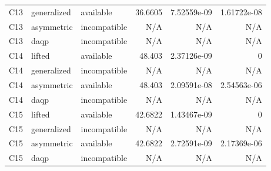 \begin{table}[htbp]
\begin{tabularx}{\textwidth}{@{}ll>{\raggedright\arraybackslash}Xrrr@{}}
C13 & generalized & available & 36.\allowbreak{}6605 & 7.\allowbreak{}52559e-09 & 1.\allowbreak{}61722e-08\\
C13 & asymmetric & incompatible & N/\allowbreak{}A & N/\allowbreak{}A & N/\allowbreak{}A\\
C13 & daqp & incompatible & N/\allowbreak{}A & N/\allowbreak{}A & N/\allowbreak{}A\\
C14 & lifted & available & 48.\allowbreak{}403 & 2.\allowbreak{}37126e-09 & 0\\
C14 & generalized & incompatible & N/\allowbreak{}A & N/\allowbreak{}A & N/\allowbreak{}A\\
C14 & asymmetric & available & 48.\allowbreak{}403 & 2.\allowbreak{}09591e-08 & 2.\allowbreak{}54563e-06\\
C14 & daqp & incompatible & N/\allowbreak{}A & N/\allowbreak{}A & N/\allowbreak{}A\\
C15 & lifted & available & 42.\allowbreak{}6822 & 1.\allowbreak{}43467e-09 & 0\\
C15 & generalized & incompatible & N/\allowbreak{}A & N/\allowbreak{}A & N/\allowbreak{}A\\
C15 & asymmetric & available & 42.\allowbreak{}6822 & 2.\allowbreak{}72591e-09 & 2.\allowbreak{}17369e-06\\
C15 & daqp & incompatible & N/\allowbreak{}A & N/\allowbreak{}A & N/\allowbreak{}A\\
\bottomrule\end{tabularx}
\end{table}
